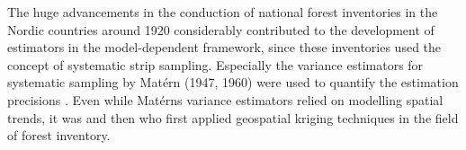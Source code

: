 The huge advancements in the conduction of national forest inventories in the Nordic countries around 1920 considerably contributed to the development of estimators in the model-dependent framework, since these inventories used the concept of systematic strip sampling. Especially the variance estimators for systematic sampling by Mat\'{e}rn (1947, 1960) were used to quantify the estimation precisions \citep{kangas2006}. Even while Mat\'{e}rns variance estimators relied on modelling spatial trends, it was \citet{houllier1987} and then \citet{mandallaz1993} who first applied geospatial kriging techniques in the field of forest inventory.\par


%
